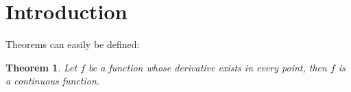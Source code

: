 \documentclass{article}
\newtheorem{theorem}{Theorem}
\begin{document}
\section{Introduction}
Theorems can easily be defined:

\begin{theorem}
Let \(f\) be a function whose derivative exists in every point, then \(f\) 
is a continuous function.
\end{theorem}
\end{document}

